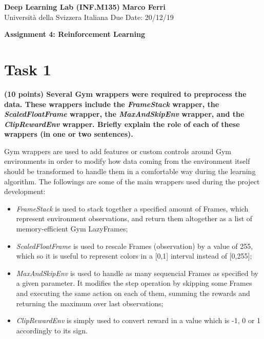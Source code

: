 \documentclass[12pt]{article}
\begin{document}

\textbf{Deep Learning Lab (INF.M135)} \hfill \textbf{Marco Ferri} \\
\normalsize Università della Svizzera Italiana \hfill Due Date: 20/12/19 \\

\begin{center}
\textbf{Assignment 4: Reinforcement Learning}
\end{center}




\section*{Task 1}

\textbf{(10 points) Several Gym wrappers were required to preprocess the data. These wrappers include the \textit{FrameStack} wrapper, the \textit{ScaledFloatFrame} wrapper, the \textit{MaxAndSkipEnv} wrapper, and the \textit{ClipRewardEnv} wrapper. Briefly explain the role of each of these wrappers (in one or two sentences).}

Gym wrappers are used to add features or custom controls around Gym environments in order to modify how data coming from the environment itself should be transformed to handle them in a comfortable way during the learning algorithm. The followings are some of the main wrappers used during the project development:

\begin{itemize}
	\item \textit{FrameStack} is used to stack together a specified amount of Frames, which represent environment observations, and return them altogether as a list of memory-efficient Gym LazyFrames;
	\item \textit{ScaledFloatFrame} is used to rescale Frames (observation) by a value of 255, which so it is useful to represent colors in a [0,1] interval instead of [0,255];
	\item \textit{MaxAndSkipEnv} is used to handle as many sequencial Frames as specified by a given parameter. It modifies the step operation by skipping some Frames and executing the same action on each of them, summing the rewards and returning the maximum over last observations;
	\item \textit{ClipRewardEnv} is simply used to convert reward in a value which is -1, 0 or 1 accordingly to its sign.
\end{itemize}
\end{document}
